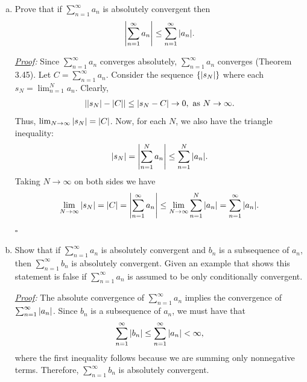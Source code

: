 \documentclass[11pt]{article}
\begin{document}
\begin{enumerate}[(a)]
	\item Prove that if $\sum^\infty_{n=1}a_n$ is absolutely convergent then 
	\begin{align*}
	\abs{\sum^\infty_{n=1}a_n} \leq \sum^\infty_{n=1}\abs{a_n}.
	\end{align*} 
	
	
	
	\noindent \textit{\underline{Proof}:} Since $\sum^\infty_{n=1}a_n$ converges absolutely, $\sum^\infty_{n=1}a_n$ converges (Theorem 3.45). Let $C = \sum^\infty_{n=1}a_n$. Consider the sequence $\{\abs{s_N}\}$ where each $s_N = {\lim^{N}_{n=1}a_n}$.  Clearly, 
	\begin{align*}
	\abs{\abs{s_N} - \abs{C}} \leq \abs{ s_N - C} \to 0, \mbox{ as } N\to \infty.
	\end{align*}
	Thus, $\lim_{N\to \infty}\abs{s_N} = \abs{C}$. Now, for each $N$, we also have the triangle inequality:
	\begin{align*}
	\abs{s_N} = \abs{\sum^N_{n=1}a_n} \leq \sum^N_{n=1}\abs{a_n}.
	\end{align*}
	Taking $N\to \infty$ on both sides we have
	\begin{align*}
	\lim_{N\to \infty}\abs{s_N} = \abs{C} =  \abs{\sum^\infty_{n=1}a_n} \leq \lim_{N\to \infty} \sum^N_{n=1}\abs{a_n} = \sum^\infty_{n=1}\abs{a_n}.
	\end{align*}
 	\hfill $\square$
	
	
	
	
	
	
	
	
	
	
	
	
	
	
	
	
	
	
	
	
	
	\item Show that if $\sum^\infty_{n=1}a_n$ is absolutely convergent and $b_n$ is a subsequence of $a_n$, then $\sum^\infty_{n=1}b_n$ is absolutely convergent. Given an example that shows this statement is false if $\sum^\infty_{n=1}a_n$ is assumed to be only conditionally convergent. 
	
	
	
	\noindent \textit{\underline{Proof}:} The absolute convergence of $\sum^\infty_{n=1}a_n$ implies the convergence of $\sum^\infty_{n=1}\abs{a_n}$. Since $b_n$ is a subsequence of $a_n$, we must have that
	\begin{align*}
	\sum^\infty_{n=1}\abs{b_n} \leq \sum^\infty_{n=1}\abs{a_n} < \infty, 
	\end{align*} 
	where the first inequality follows because we are summing only nonnegative terms. Therefore, $\sum^\infty_{n=1}b_n$ is absolutely convergent. 
	

\end{enumerate}
\end{document}
